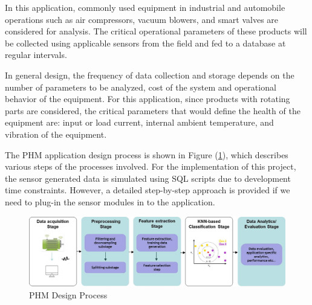 \documentclass[sigconf]{acmart}
\begin{document}
In this application, commonly used equipment in industrial and automobile operations such as air compressors, vacuum blowers, and smart valves are considered for analysis. The critical operational parameters of these products will be collected using applicable sensors from the field and fed to a database at regular intervals.

In general design, the frequency of data collection and storage depends on the number of parameters to be analyzed, cost of the system and operational behavior of the equipment. For this application, since products with rotating parts are considered, the critical parameters that would define the health of the equipment are: input or load current, internal ambient temperature, and vibration of the equipment.

The PHM application design process is shown in Figure (\ref{fig:Figure2}), which describes various steps of the processes involved. For the implementation of this project, the sensor generated data is simulated using SQL scripts due to development time constraints. However, a detailed step-by-step approach is provided if we need to plug-in the sensor modules in to the application.



\begin{figure}
\includegraphics[width=1.0\columnwidth]{images/phm_process_1}
\caption{PHM Design Process} \label{fig:Figure2}
\end{figure}
\end{document}
